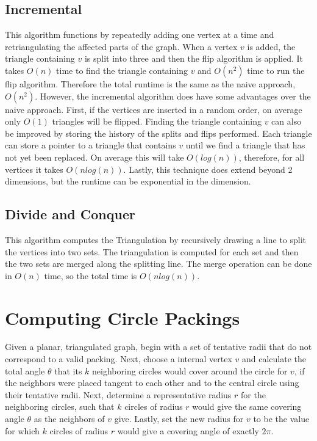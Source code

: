 \documentclass[english]{article}
\begin{document}
\subsection{Incremental}
This algorithm  functions by repeatedly adding one vertex at a time and retriangulating the affected parts of the graph. When a vertex $v$ is added, the triangle containing $v$ is split into three and then the flip algorithm is applied. It takes $O(n)$ time to find the triangle containing $v$ and $O(n^2)$ time to run the flip algorithm. Therefore the total runtime is the same as the naive approach, $O(n^2)$. However, the incremental algorithm does have some advantages over the naive approach. First, if the vertices are inserted in a random order, on average only $O(1)$ triangles will be flipped. Finding the triangle containing $v$ can also be improved by storing the history of the splits and flips performed. Each triangle can store a pointer to a triangle that contains $v$ until we find a triangle that has not yet been replaced. On average this will take $O(log(n))$, therefore, for all vertices it takes $O(nlog(n))$. Lastly, this technique does extend beyond 2 dimensions, but the runtime can be exponential in the dimension. 
\subsection{Divide and Conquer}
This algorithm computes the Triangulation by recursively drawing a line to split the vertices into two sets. The triangulation is computed for each set and then the two sets are merged along the splitting line. The merge operation can be done in $O(n)$ time, so the total time is $O(nlog(n))$.

\section{Computing Circle Packings}
Given a planar, triangulated graph, begin with a set of tentative radii that do not correspond to a valid packing. Next, choose a internal vertex $v$ and calculate the total angle $\theta$ that its $k$ neighboring circles would cover around the circle for $v$, if the neighbors were placed tangent to each other and to the central circle using their tentative radii. Next, determine a representative radius $r$ for the neighboring circles, such that $k$ circles of radius $r$ would give the same covering angle $\theta$ as the neighbors of $v$ give. Lastly, set the new radius for $v$ to be the value for which $k$ circles of radius $r$ would give a covering angle of exactly $2\pi$.




\end{document}
